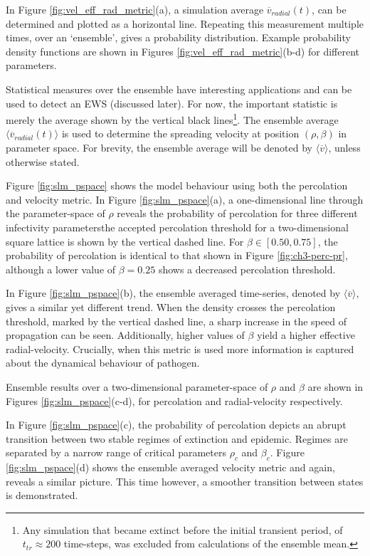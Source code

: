 In Figure \ref{fig:vel_eff_rad_metric}(a), a simulation average $\overline{v}_{radial}(t)$, can be  determined and plotted as a horizontal line. %
Repeating this measurement multiple times, over an `ensemble', gives a probability distribution. %
Example  probability density functions are shown in Figures \ref{fig:vel_eff_rad_metric}(b-d) for different parameters.%

Statistical measures over the ensemble have interesting applications and can be used to detect an EWS (discussed later). %
For now, the important statistic is merely the average shown by the vertical black %
lines\footnote{Any simulation that became extinct before the initial transient period, %
of $t_{tr}\approx 200$ time-steps, was excluded from calculations of the ensemble mean.}. %
The ensemble average $\big\langle \overline{v}_{radial}(t) \big\rangle$ is used to determine the spreading velocity at position $(\rho, \beta)$ in parameter space. %
For brevity, the ensemble average will be denoted by $\big\langle\overline{v}\big\rangle$, unless otherwise stated. %

Figure \ref{fig:slm_pspace} shows the model behaviour using both the percolation and velocity metric. %
In Figure \ref{fig:slm_pspace}(a), a one-dimensional line through the parameter-space of $\rho$ reveals the probability of percolation for three different infectivity parameters\textemdash the accepted percolation threshold for a two-dimensional square lattice is shown by the vertical dashed line. %
For $\beta \in [0.50, 0.75]$, the probability of percolation is identical to that shown in Figure \ref{fig:ch3-perc-pr}, although a lower value of $\beta = 0.25$ shows a decreased percolation threshold. %

In Figure \ref{fig:slm_pspace}(b), the ensemble averaged time-series, denoted by $\big\langle \overline{v} \big\rangle$, gives a similar yet different trend. %
When the density crosses the percolation threshold, marked by the vertical dashed line, a sharp increase in the speed of propagation can be seen. Additionally, higher values of $\beta$ yield a higher effective radial-velocity. %
Crucially, when this metric is used more information is captured about the dynamical behaviour of pathogen. %

Ensemble results over a two-dimensional parameter-space of $\rho$ and $\beta$ are shown in Figures \ref{fig:slm_pspace}(c-d), %
for percolation and radial-velocity respectively. %

In Figure \ref{fig:slm_pspace}(c), the probability of percolation depicts an abrupt transition between two stable regimes of extinction and epidemic. %
Regimes are separated by a narrow range of critical parameters $\rho_c$ and $\beta_c$. Figure \ref{fig:slm_pspace}(d) shows the ensemble averaged velocity metric and again, %
reveals a similar picture. %
This time however, a smoother transition between states is demonstrated. %

